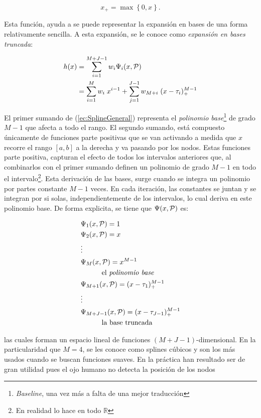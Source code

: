 \documentclass[../Main/Main.tex]{subfiles}
\begin{document}
$$  x_+ = \max\left\{0,x\right\}.$$

Esta función, ayuda a se puede representar la expansión en bases de una forma relativamente sencilla. A esta expansión, se le conoce como \textit{expansión en bases truncada}:

\begin{align}
	h(x) &= \sum_{i = 1}^{M + J - 1} w_i \Psi_i(x,\mathcal{P}) \nonumber \\ 
 		 &=	\sum_{i = 1}^M w_i \; x^{i-1} + \sum_{j = 1}^{J-1}w_{M+i}\;(x - \t_i)_+^{M-1}	\label{ec:SplineGeneral}
\end{align}

El primer sumando de (\ref{ec:SplineGeneral}) representa el \textit{polinomio base}\footnote{\textit{Baseline}, una vez más a falta de una mejor traducción} de grado $M-1$ %
que afecta a todo el rango. El segundo sumando, está compuesto únicamente de funciones parte positivas que se van activando a medida que $x$ recorre el rango $[a,b]$ a la derecha y va pasando por los nodos. Estas funciones parte positiva, capturan el efecto de todos los intervalos anteriores que, al combinarlos con el primer sumando definen un polinomio de grado $M-1$ en todo el intervalo\footnote{En realidad lo hace en todo $\mathbb{R}$}. Esta derivación de las bases, surge cuando se integra un polinomio por partes constante $M-1$ veces. En cada iteración, las constantes se juntan y se integran por si solas, independientemente de los intervalos, lo cual deriva en este polinomio base. De forma explicita, se tiene que $\Psi(x,\P)$ es:

\begin{align*}
	&\Psi_1(x,\P) = 1 \\ 
	&\Psi_2(x,\P) = x \\ 
	& \vdots \\
	&\Psi_M(x,\P) = x^{M-1}\\
	& \quad \quad \quad \text{el \textit{polinomio base}}\\				
	&\Psi_{M + 1}(x,\P) = (x - \t_1)_+^{M-1} \\				
	& \vdots \\
	&\Psi_{M + J - 1}(x,\P) = (x - \t_{J - 1})_+^{M-1} \\
	& \quad \quad \quad \text{la base truncada}		 
\end{align*}

las cuales forman un espacio lineal de funciones $(M + J - 1)$-dimensional. En la particularidad que $M = 4$, se les conoce como splines cúbicos y son los más usados cuando se buscan funciones suaves. En la práctica han resultado ser de gran utilidad pues el ojo humano no detecta la posición de los nodos\\ 
\end{document}
